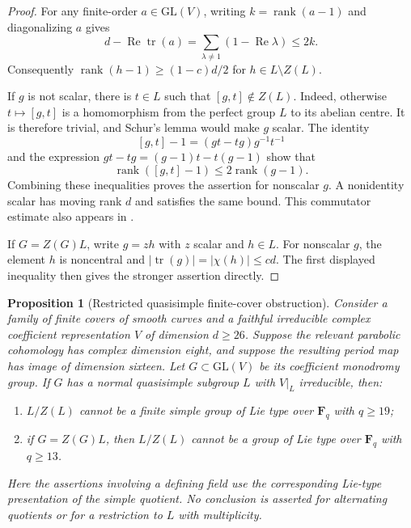 \documentclass[11pt]{article}
\newtheorem{proposition}[theorem]{Proposition}
\theoremstyle{definition}
\theoremstyle{remark}
\begin{document}
\begin{proof}
For any finite-order $a\in\mathrm{GL}(V)$, writing $k=\operatorname{rank}(a-1)$
and diagonalizing $a$ gives
\[
 d-\operatorname{Re}\operatorname{tr}(a)
   =\sum_{\lambda\ne1}(1-\operatorname{Re}\lambda)\le2k.
\]
Consequently $\operatorname{rank}(h-1)\ge(1-c)d/2$ for
$h\in L\setminus Z(L)$.

If $g$ is not scalar, there is $t\in L$ such that $[g,t]\notin Z(L)$.
Indeed, otherwise $t\mapsto[g,t]$ is a homomorphism from the perfect group
$L$ to its abelian centre.  It is therefore trivial, and Schur's lemma
would make $g$ scalar.  The identity
\[
 [g,t]-1=(gt-tg)g^{-1}t^{-1}
\]
and the expression $gt-tg=(g-1)t-t(g-1)$ show that
\[
 \operatorname{rank}([g,t]-1)\le2\operatorname{rank}(g-1).
\]
Combining these inequalities proves the assertion for nonscalar $g$.
A nonidentity scalar has moving rank $d$ and satisfies the same bound.
This commutator estimate also appears in
\cite[Lemma~3.1]{DuyanHalasiPodoskiRandomBases}.

If $G=Z(G)L$, write $g=zh$ with $z$ scalar and $h\in L$.
For nonscalar $g$, the element $h$ is noncentral and
$|\operatorname{tr}(g)|=|\chi(h)|\le cd$.  The first displayed inequality
then gives the stronger assertion directly.
\end{proof}

\begin{proposition}[Restricted quasisimple finite-cover obstruction]
\label{prop:quasisimple-cover-obstruction}
Consider a family of finite covers of smooth curves and a faithful
irreducible complex coefficient representation $V$ of dimension $d\ge26$.
Suppose the relevant parabolic cohomology has complex dimension eight,
and suppose the resulting period map has image of dimension sixteen.
Let $G\subset\mathrm{GL}(V)$ be its coefficient monodromy group.
If $G$ has a normal quasisimple subgroup $L$ with $V|_L$ irreducible, then:
\begin{enumerate}
\item $L/Z(L)$ cannot be a finite simple group of Lie type over
      $\mathbf F_q$ with $q\ge19$;
\item if $G=Z(G)L$, then $L/Z(L)$ cannot be a group
      of Lie type over $\mathbf F_q$ with $q\ge13$.
\end{enumerate}
Here the assertions involving a defining field use the corresponding
Lie-type presentation of the simple quotient.  No conclusion is asserted
for alternating quotients or for a restriction to $L$ with multiplicity.
\end{proposition}
\end{document}
